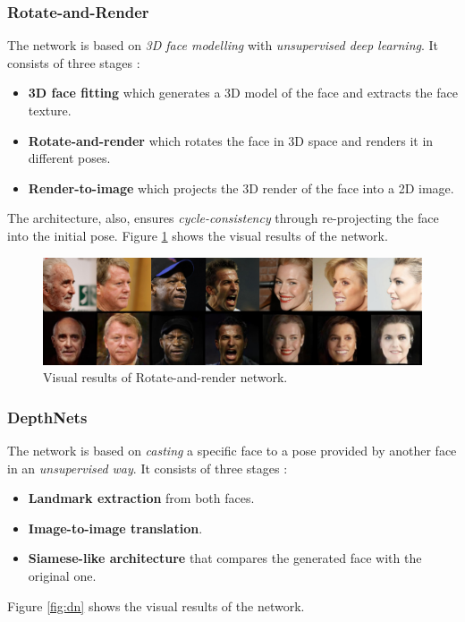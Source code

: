 \subsubsection{Rotate-and-Render}

The network \cite{zhou2020rotateandrender} is based on \emph{3D face modelling} with \emph{unsupervised deep learning}. It consists of three stages : 
\begin{itemize}
    \item \textbf{3D face fitting} which generates a 3D model of the face and extracts the face texture.
    \item \textbf{Rotate-and-render} which rotates the face in 3D space and renders it in different poses.
    \item \textbf{Render-to-image} which projects the 3D render of the face into a 2D image.
\end{itemize}
The architecture, also, ensures \emph{cycle-consistency} through re-projecting the face into the initial pose. Figure \ref{fig:r&r} shows the visual results of the network.

\begin{figure}[H]
    \centering
    \includegraphics[width=\textwidth]{images/rotate-and-render.png}
    \caption{Visual results of Rotate-and-render network.}
    \label{fig:r&r}
\end{figure}

\subsubsection{DepthNets}
The network \cite{moniz2018unsupervised} is based on \emph{casting} a specific face to a pose provided by another face in an \emph{unsupervised way}. It consists of three stages :
\begin{itemize}
    \item \textbf{Landmark extraction} from both faces.
    \item \textbf{Image-to-image translation}.
    \item \textbf{Siamese-like architecture} that compares the generated face with the original one.
\end{itemize}
Figure \ref{fig:dn} shows the visual results of the network.

